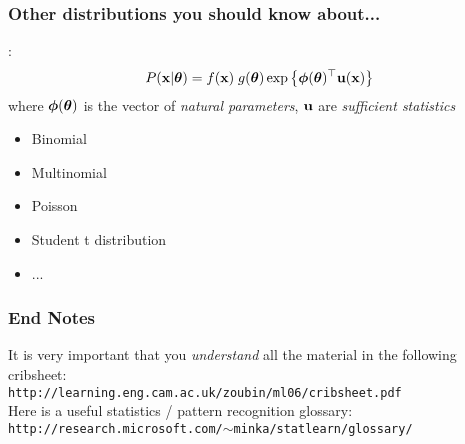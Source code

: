 \begin{frame}
\frametitle{Other distributions you should know about...}

:
\[
P(\mathbf x|\boldsymbol{\theta}) = f(\mathbf x) \; g(\boldsymbol{\theta}) \exp \left\{
\boldsymbol{\phi}(\boldsymbol{\theta})^\top \mathbf u(
\mathbf x) \right\}
\]
where $\boldsymbol{\phi}(\boldsymbol{\theta})$ is the vector of {\em natural parameters},
$\mathbf u$ are {\em sufficient statistics}


\begin{itemize}
\item Binomial 
\item Multinomial
\item Poisson
\item Student t distribution
\item ...
\end{itemize}

\end{frame}
\begin{frame}
\frametitle{End Notes}

It is very important that you {\em understand} all the material in the
following cribsheet:\\
{\small \tt http://learning.eng.cam.ac.uk/zoubin/ml06/cribsheet.pdf}\\

Here is a useful statistics / pattern recognition glossary:\\
{\small \tt http://research.microsoft.com/$\sim$minka/statlearn/glossary/}\\

\end{frame}


